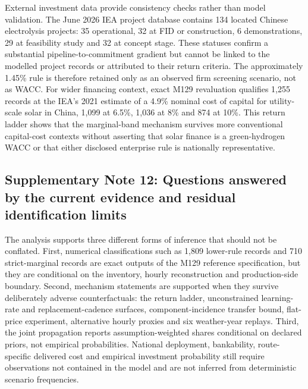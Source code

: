 \documentclass[11pt,a4paper]{article}
\begin{document}
External investment data provide consistency checks rather than model validation. The June 2026 IEA project database contains 134 located Chinese electrolysis projects: 35 operational, 32 at FID or construction, 6 demonstrations, 29 at feasibility study and 32 at concept stage\cite{ieaprojects2026}. These statuses confirm a substantial pipeline-to-commitment gradient but cannot be linked to the modelled project records or attributed to their return criteria. The approximately 1.45\% rule is therefore retained only as an observed firm screening scenario, not as WACC. For wider financing context, exact M129 revaluation qualifies 1,255 records at the IEA's 2021 estimate of a 4.9\% nominal cost of capital for utility-scale solar in China, 1,099 at 6.5\%, 1,036 at 8\% and 874 at 10\%\cite{ieacapital}. This return ladder shows that the marginal-band mechanism survives more conventional capital-cost contexts without asserting that solar finance is a green-hydrogen WACC or that either disclosed enterprise rule is nationally representative.

\subsection*{Supplementary Note 12: Questions answered by the current evidence and residual identification limits}

The analysis supports three different forms of inference that should not be conflated. First, numerical classifications such as 1,809 lower-rule records and 710 strict-marginal records are exact outputs of the M129 reference specification, but they are conditional on the inventory, hourly reconstruction and production-side boundary. Second, mechanism statements are supported when they survive deliberately adverse counterfactuals: the return ladder, unconstrained learning-rate and replacement-cadence surfaces, component-incidence transfer bound, flat-price experiment, alternative hourly proxies and six weather-year replays. Third, the joint propagation reports assumption-weighted shares conditional on declared priors, not empirical probabilities. National deployment, bankability, route-specific delivered cost and empirical investment probability still require observations not contained in the model and are not inferred from deterministic scenario frequencies.
\end{document}
